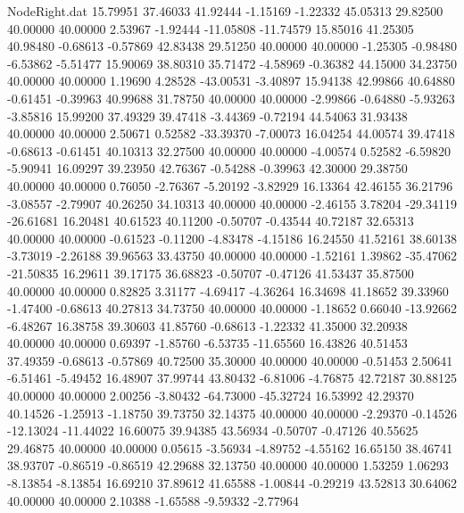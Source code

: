 \begin{filecontents}{NodeRight.dat}
  15.79951   37.46033   41.92444    -1.15169   -1.22332   45.05313   29.82500   40.00000   40.00000    2.53967   -1.92444  -11.05808  -11.74579
  15.85016   41.25305   40.98480    -0.68613   -0.57869   42.83438   29.51250   40.00000   40.00000   -1.25305   -0.98480   -6.53862   -5.51477
  15.90069   38.80310   35.71472    -4.58969   -0.36382   44.15000   34.23750   40.00000   40.00000    1.19690    4.28528  -43.00531   -3.40897
  15.94138   42.99866   40.64880    -0.61451   -0.39963   40.99688   31.78750   40.00000   40.00000   -2.99866   -0.64880   -5.93263   -3.85816
  15.99200   37.49329   39.47418    -3.44369   -0.72194   44.54063   31.93438   40.00000   40.00000    2.50671    0.52582  -33.39370   -7.00073
  16.04254   44.00574   39.47418    -0.68613   -0.61451   40.10313   32.27500   40.00000   40.00000   -4.00574    0.52582   -6.59820   -5.90941
  16.09297   39.23950   42.76367    -0.54288   -0.39963   42.30000   29.38750   40.00000   40.00000    0.76050   -2.76367   -5.20192   -3.82929
  16.13364   42.46155   36.21796    -3.08557   -2.79907   40.26250   34.10313   40.00000   40.00000   -2.46155    3.78204  -29.34119  -26.61681
  16.20481   40.61523   40.11200    -0.50707   -0.43544   40.72187   32.65313   40.00000   40.00000   -0.61523   -0.11200   -4.83478   -4.15186
  16.24550   41.52161   38.60138    -3.73019   -2.26188   39.96563   33.43750   40.00000   40.00000   -1.52161    1.39862  -35.47062  -21.50835
  16.29611   39.17175   36.68823    -0.50707   -0.47126   41.53437   35.87500   40.00000   40.00000    0.82825    3.31177   -4.69417   -4.36264
  16.34698   41.18652   39.33960    -1.47400   -0.68613   40.27813   34.73750   40.00000   40.00000   -1.18652    0.66040  -13.92662   -6.48267
  16.38758   39.30603   41.85760    -0.68613   -1.22332   41.35000   32.20938   40.00000   40.00000    0.69397   -1.85760   -6.53735  -11.65560
  16.43826   40.51453   37.49359    -0.68613   -0.57869   40.72500   35.30000   40.00000   40.00000   -0.51453    2.50641   -6.51461   -5.49452
  16.48907   37.99744   43.80432    -6.81006   -4.76875   42.72187   30.88125   40.00000   40.00000    2.00256   -3.80432  -64.73000  -45.32724
  16.53992   42.29370   40.14526    -1.25913   -1.18750   39.73750   32.14375   40.00000   40.00000   -2.29370   -0.14526  -12.13024  -11.44022
  16.60075   39.94385   43.56934    -0.50707   -0.47126   40.55625   29.46875   40.00000   40.00000    0.05615   -3.56934   -4.89752   -4.55162
  16.65150   38.46741   38.93707    -0.86519   -0.86519   42.29688   32.13750   40.00000   40.00000    1.53259    1.06293   -8.13854   -8.13854
  16.69210   37.89612   41.65588    -1.00844   -0.29219   43.52813   30.64062   40.00000   40.00000    2.10388   -1.65588   -9.59332   -2.77964

\end{filecontents}
